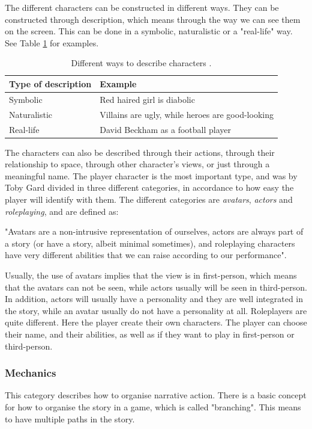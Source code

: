 The different characters can be constructed in different ways. They can be constructed through description, which means through the way we can see them on the screen. This can be done in a symbolic, naturalistic or a "real-life" way. See Table \ref{tab:description} for examples.

\begin{table}
\centering
    \begin{tabular}{|l|l|}
        \hline
        \textbf{Type of description} & \textbf{Example} \\ \hline
       Symbolic & Red haired girl is diabolic  \\ \hline
       Naturalistic & Villains are ugly, while heroes are good-looking \\ \hline
       Real-life & David Beckham as a football player \\ \hline
    \end{tabular}
    \caption[Different ways to describe characters]{Different ways to describe characters \cite{understandingvg}.}
    \label{tab:description}
\end{table} 

The characters can also be described through their actions, through their relationship to space, through other character’s views, or just through a meaningful name. The player character is the most important type, and was by Toby Gard divided in three different categories, in accordance to how easy the player will identify with them. The different categories are \emph{avatars}, \emph{actors} and \emph{roleplaying}, and are defined as:

"Avatars are a non-intrusive representation of ourselves, actors are always part of a story (or have a story, albeit minimal sometimes), and roleplaying characters have very different abilities that we can raise according to our performance". \cite{understandingvg}

Usually, the use of avatars implies that the view is in first-person, which means that the avatars can not be seen, while actors usually will be seen in third-person. In addition, actors will usually have a personality and they are well integrated in the story, while an avatar usually do not have a personality at all. Roleplayers are quite different. Here the player create their own characters. The player can choose their name, and their abilities, as well as if they want to play in first-person or third-person.  

\subsubsection{Mechanics}
This category describes how to organise narrative action. There is a basic concept for how to organise the story in a game, which is called "branching". This means to have multiple paths in the story. 


